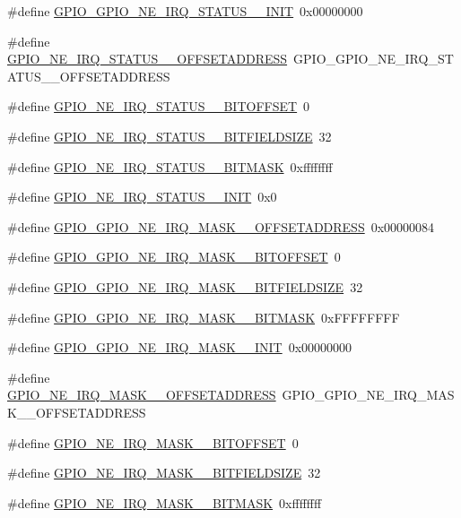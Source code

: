 \begin{DoxyCompactItemize}
\item 
\#define \hyperlink{a00553_a3487f6e3dbbd8553b40307742adc0341}{GPIO\_\-GPIO\_\-NE\_\-IRQ\_\-STATUS\_\_\-INIT}~0x00000000
\item 
\#define \hyperlink{a00553_a153e7b3349229d897f3e6a90ae6bd45f}{GPIO\_\-NE\_\-IRQ\_\-STATUS\_\_\-OFFSETADDRESS}~GPIO\_\-GPIO\_\-NE\_\-IRQ\_\-STATUS\_\_\-OFFSETADDRESS
\item 
\#define \hyperlink{a00553_ac628da2d9ee14e23d241ac03535db1e4}{GPIO\_\-NE\_\-IRQ\_\-STATUS\_\_\-BITOFFSET}~0
\item 
\#define \hyperlink{a00553_a587fceaecf1408cb583f600f48dff328}{GPIO\_\-NE\_\-IRQ\_\-STATUS\_\_\-BITFIELDSIZE}~32
\item 
\#define \hyperlink{a00553_ac051a5245cdb6df38b94e7ac5214e27f}{GPIO\_\-NE\_\-IRQ\_\-STATUS\_\_\-BITMASK}~0xffffffff
\item 
\#define \hyperlink{a00553_a7f1c64eb058b6707591292a43a24bf61}{GPIO\_\-NE\_\-IRQ\_\-STATUS\_\_\-INIT}~0x0
\item 
\#define \hyperlink{a00553_a1580a4878356be5de5793bb5bb3971b6}{GPIO\_\-GPIO\_\-NE\_\-IRQ\_\-MASK\_\_\-OFFSETADDRESS}~0x00000084
\item 
\#define \hyperlink{a00553_a2b8458330b71de69747107e1c051827f}{GPIO\_\-GPIO\_\-NE\_\-IRQ\_\-MASK\_\_\-BITOFFSET}~0
\item 
\#define \hyperlink{a00553_ac3bc0a508a13cb7415c73aec905c404d}{GPIO\_\-GPIO\_\-NE\_\-IRQ\_\-MASK\_\_\-BITFIELDSIZE}~32
\item 
\#define \hyperlink{a00553_ae80578d7a2b6eb5ca588336f650c543e}{GPIO\_\-GPIO\_\-NE\_\-IRQ\_\-MASK\_\_\-BITMASK}~0xFFFFFFFF
\item 
\#define \hyperlink{a00553_a3635169fa14b0734659ddacc63535182}{GPIO\_\-GPIO\_\-NE\_\-IRQ\_\-MASK\_\_\-INIT}~0x00000000
\item 
\#define \hyperlink{a00553_a9b7399d3e3517db2b67e8bf228c64b5a}{GPIO\_\-NE\_\-IRQ\_\-MASK\_\_\-OFFSETADDRESS}~GPIO\_\-GPIO\_\-NE\_\-IRQ\_\-MASK\_\_\-OFFSETADDRESS
\item 
\#define \hyperlink{a00553_ab5a1f255cdf1949c4b01416848784780}{GPIO\_\-NE\_\-IRQ\_\-MASK\_\_\-BITOFFSET}~0
\item 
\#define \hyperlink{a00553_af9a56b2526a0b97da3bb27283806660d}{GPIO\_\-NE\_\-IRQ\_\-MASK\_\_\-BITFIELDSIZE}~32
\item 
\#define \hyperlink{a00553_aeb40c8aadc233e72142d7d7dac048081}{GPIO\_\-NE\_\-IRQ\_\-MASK\_\_\-BITMASK}~0xffffffff
\item 

\end{DoxyCompactItemize}
